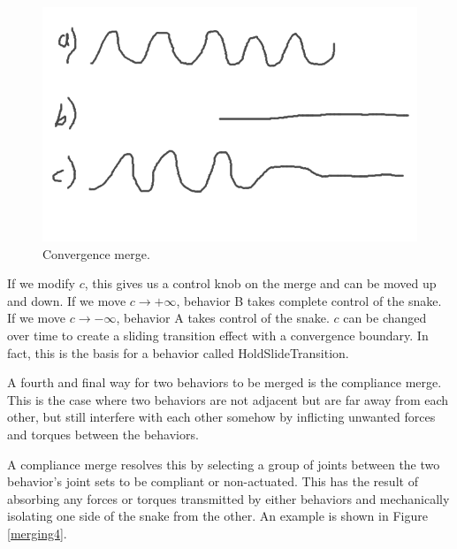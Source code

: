 \begin{figure}
\begin{center}
\includegraphics[scale=0.5]{2_behaviors_3.png}
\end{center}
\caption{Convergence merge.}
\label{merging3}
\end{figure}

If we modify $c$, this gives us a control knob on the merge and can be moved up and down.  If we move $c \to +\infty$, behavior B takes complete control of the snake.  If we move $c \to -\infty$, behavior A takes control of the snake.  $c$ can be changed over time to create a sliding transition effect with a convergence boundary.  In fact, this is the basis for a behavior called HoldSlideTransition.

A fourth and final way for two behaviors to be merged is the compliance merge.  This is the case where two behaviors are not adjacent but are far away from each other, but still interfere with each other somehow by inflicting unwanted forces and torques between the behaviors.

A compliance merge resolves this by selecting a group of joints between the two behavior’s joint sets to be compliant or non-actuated.  This has the result of absorbing any forces or torques transmitted by either behaviors and mechanically isolating one side of the snake from the other.  An example is shown in Figure \ref{merging4}.

